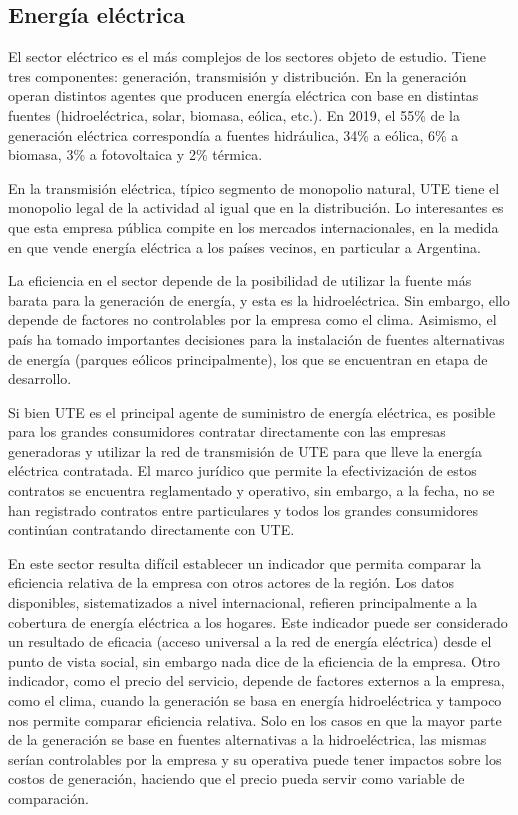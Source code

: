 \documentclass[
  12pt,
  spanish,
]{book}
\begin{document}
\hypertarget{energuxeda-eluxe9ctrica}{%
\subsection{Energía eléctrica}\label{energuxeda-eluxe9ctrica}}

El sector eléctrico es el más complejos de los sectores objeto de estudio. Tiene tres componentes: generación, transmisión y distribución. En la generación operan distintos agentes que producen energía eléctrica con base en distintas fuentes (hidroeléctrica, solar, biomasa, eólica, etc.). En 2019, el 55\% de la generación eléctrica correspondía a fuentes hidráulica, 34\% a eólica, 6\% a biomasa, 3\% a fotovoltaica y 2\% térmica.

En la transmisión eléctrica, típico segmento de monopolio natural, UTE tiene el monopolio legal de la actividad al igual que en la distribución. Lo interesantes es que esta empresa pública compite en los mercados internacionales, en la medida en que vende energía eléctrica a los países vecinos, en particular a Argentina.

La eficiencia en el sector depende de la posibilidad de utilizar la fuente más barata para la generación de energía, y esta es la hidroeléctrica. Sin embargo, ello depende de factores no controlables por la empresa como el clima. Asimismo, el país ha tomado importantes decisiones para la instalación de fuentes alternativas de energía (parques eólicos principalmente), los que se encuentran en etapa de desarrollo.

Si bien UTE es el principal agente de suministro de energía eléctrica, es posible para los grandes consumidores contratar directamente con las empresas generadoras y utilizar la red de transmisión de UTE para que lleve la energía eléctrica contratada. El marco jurídico que permite la efectivización de estos contratos se encuentra reglamentado y operativo, sin embargo, a la fecha, no se han registrado contratos entre particulares y todos los grandes consumidores continúan contratando directamente con UTE.

En este sector resulta difícil establecer un indicador que permita comparar la eficiencia relativa de la empresa con otros actores de la región. Los datos disponibles, sistematizados a nivel internacional, refieren principalmente a la cobertura de energía eléctrica a los hogares. Este indicador puede ser considerado un resultado de eficacia (acceso universal a la red de energía eléctrica) desde el punto de vista social, sin embargo nada dice de la eficiencia de la empresa. Otro indicador, como el precio del servicio, depende de factores externos a la empresa, como el clima, cuando la generación se basa en energía hidroeléctrica y tampoco nos permite comparar eficiencia relativa. Solo en los casos en que la mayor parte de la generación se base en fuentes alternativas a la hidroeléctrica, las mismas serían controlables por la empresa y su operativa puede tener impactos sobre los costos de generación, haciendo que el precio pueda servir como variable de comparación.
\end{document}
